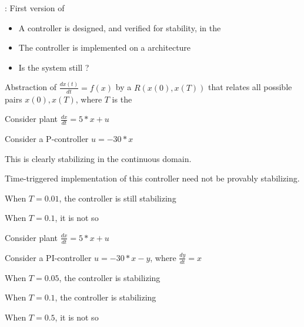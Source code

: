 \documentclass{seminar}
\begin{document}
\begin{slide}

{}: First version of {}

\medskip
{} 
\begin{itemize}
\item
A controller is designed, and verified for stability, 
in the {}
\item
The controller is implemented on a
{} architecture
\item
Is the system still {}?
\end{itemize}

\medskip
{} 
Abstraction of $\frac{dx(t)}{dt} = f(x)$ by a {}
$R(x(0),x(T))$ that relates all possible pairs
$x(0),x(T)$, where $T$ is the {}

\end{slide}
\begin{slide}

Consider plant $\frac{dx}{dt} = 5*x + u$

Consider a P-controller $u = -30*x$

This is clearly stabilizing in the continuous domain.

Time-triggered implementation of this controller need
not be provably stabilizing.

When $T = 0.01$, the controller is still stabilizing

When $T = 0.1$, it is not so

\end{slide}
\begin{slide}

Consider plant $\frac{dx}{dt} = 5*x + u$

Consider a PI-controller $u = -30*x - y$,
where $\frac{dy}{dt} = x$

When $T = 0.05$, the controller is stabilizing

When $T = 0.1$, the controller is stabilizing

When $T = 0.5$, it is not so

\end{slide}
\end{document}
